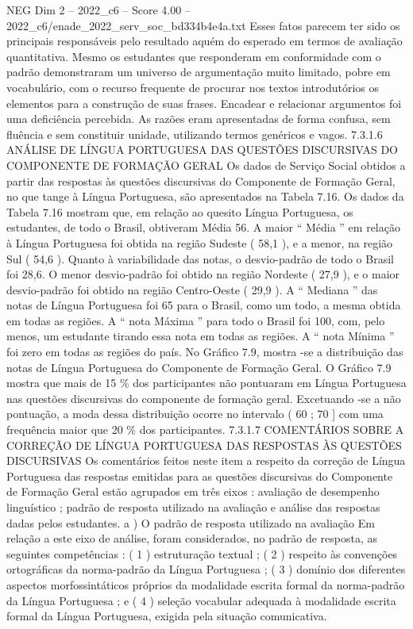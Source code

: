 \begin{textsample}{NEG Dim 2 – 2022\_c6 – Score 4.00 – 2022\_c6/enade\_2022\_serv\_soc\_bd334b4e4a.txt}
Esses fatos parecem ter sido os principais responsáveis pelo resultado aquém do esperado em termos de avaliação quantitativa.
Mesmo os estudantes que responderam em conformidade com o padrão demonstraram um universo de argumentação muito limitado, pobre em vocabulário, com o recurso frequente de procurar nos textos introdutórios os elementos para a construção de suas frases.
Encadear e relacionar argumentos foi uma deficiência percebida.
As razões eram apresentadas de forma confusa, sem fluência e sem constituir unidade, utilizando termos genéricos e vagos. 7.3.1.6 ANÁLISE DE LÍNGUA PORTUGUESA DAS QUESTÕES DISCURSIVAS DO COMPONENTE DE FORMAÇÃO GERAL Os dados de Serviço Social obtidos a partir das respostas às questões discursivas do Componente de Formação Geral, no que tange à Língua Portuguesa, são apresentados na Tabela 7.16.
Os dados da Tabela 7.16 mostram que, em relação ao quesito Língua Portuguesa, os estudantes, de todo o Brasil, obtiveram Média 56.
A maior “ Média ” em relação à Língua Portuguesa foi obtida na região Sudeste ( 58,1 ), e a menor, na região Sul ( 54,6 ).
Quanto à variabilidade das notas, o desvio-padrão de todo o Brasil foi 28,6.
O menor desvio-padrão foi obtido na região Nordeste ( 27,9 ), e o maior desvio-padrão foi obtido na região Centro-Oeste ( 29,9 ).
A “ Mediana ” das notas de Língua Portuguesa foi 65 para o Brasil, como um todo, a mesma obtida em todas as regiões.
A “ nota Máxima ” para todo o Brasil foi 100, com, pelo menos, um estudante tirando essa nota em todas as regiões.
A “ nota Mínima ” foi zero em todas as regiões do país.
No Gráfico 7.9, mostra -se a distribuição das notas de Língua Portuguesa do Componente de Formação Geral.
O Gráfico 7.9 mostra que mais de 15 \% dos participantes não pontuaram em Língua Portuguesa nas questões discursivas do componente de formação geral.
Excetuando -se a não pontuação, a moda dessa distribuição ocorre no intervalo ( 60 ; 70 ] com uma frequência maior que 20 \% dos participantes. 7.3.1.7 COMENTÁRIOS SOBRE A CORREÇÃO DE LÍNGUA PORTUGUESA DAS RESPOSTAS ÀS QUESTÕES DISCURSIVAS Os comentários feitos neste item a respeito da correção de Língua Portuguesa das respostas emitidas para as questões discursivas do Componente de Formação Geral estão agrupados em três eixos : avaliação de desempenho linguístico ; padrão de resposta utilizado na avaliação e análise das respostas dadas pelos estudantes. a ) O padrão de resposta utilizado na avaliação Em relação a este eixo de análise, foram considerados, no padrão de resposta, as seguintes competências : ( 1 ) estruturação textual ; ( 2 ) respeito às convenções ortográficas da norma-padrão da Língua Portuguesa ; ( 3 ) domínio dos diferentes aspectos morfossintáticos próprios da modalidade escrita formal da norma-padrão da Língua Portuguesa ; e ( 4 ) seleção vocabular adequada à modalidade escrita formal da Língua Portuguesa, exigida pela situação comunicativa.

\end{textsample}
